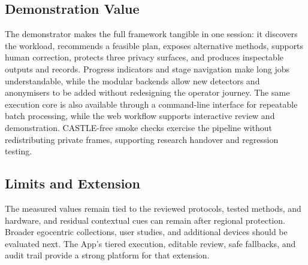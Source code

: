 \documentclass[10pt,twocolumn]{IEEEtran}
\begin{document}
\begin{strip}
\begin{minipage}[t]{0.485\textwidth}
\subsection{Demonstration Value}

The demonstrator makes the full framework tangible in one session: it discovers
the workload, recommends a feasible plan, exposes alternative methods, supports
human correction, protects three privacy surfaces, and produces inspectable
outputs and records. Progress indicators and stage navigation make long jobs
understandable, while the modular backends allow new detectors and anonymisers
to be added without redesigning the operator journey. The same execution core is
also available through a command-line interface for repeatable batch processing,
while the web workflow supports interactive review and demonstration. CASTLE-free
smoke checks exercise the pipeline without redistributing private frames,
supporting research handover and regression testing.

\subsection{Limits and Extension}

The measured values remain tied to the reviewed protocols, tested methods, and
hardware, and residual contextual cues can remain after regional protection.
Broader egocentric collections, user studies, and additional devices should be
evaluated next. The App's tiered execution, editable review, safe fallbacks, and
audit trail provide a strong platform for that extension.
\end{minipage}
\vspace{-8pt}
\end{strip}
\mbox{}

\clearpage
\end{document}
